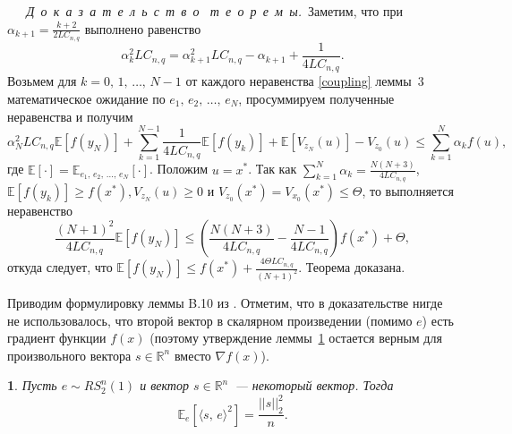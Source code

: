 \documentclass[11pt]{article}
\newcommand{\E}{\mathbb{E}}
\newcommand{\RR}{\mathbb{R}}
\newcounter{fakecnt}
\newtheorem{LemAp}{\hspace{\parindent}{\sl Л~е~м~м~а~}}[fakecnt]
\begin{document}
		\textsl{~~~Д~о~к~а~з~а~т~е~л~ь~с~т~в~о~\; т~е~о~р~е~м~ы.}\,
	Заметим, что при $\alpha_{k+1} = \frac{k+2}{2LC_{n,q}}$ выполнено равенство
	$$
	\alpha_{k}^2LC_{n,q} = \alpha_{k+1}^2LC_{n,q} - \alpha_{k+1} + \frac{1}{4LC_{n,q}}.
	$$
	Возьмем для $k=0, \, 1, \, \ldots, \, N-1$ от каждого неравенства \eqref{coupling} леммы~3 математическое ожидание по $e_1, \, e_2, \, \ldots, \, e_N$, просуммируем полученные неравенства и получим
	$$
	\alpha_N^2LC_{n,q}\E[f(y_N)] + \sum\limits_{k=1}^{N-1}\frac{1}{4LC_{n,q}}\E[f(y_k)] + \E[V_{z_{N}}(u)] - V_{z_0}(u) \leqslant \sum\limits_{k=1}^{N}\alpha_kf(u),
	$$
	где $\E[\cdot] = \E_{e_1, \, e_2, \, \ldots, \, e_N}[\cdot]$.
	Положим $u=x^*$. Так как $\sum_{k=1}^{N}\alpha_k = \frac{N(N+3)}{4LC_{n,q}}$, $\E[f(y_k)] \geqslant f(x^*), V_{z_N}(u) \geqslant 0$ и $V_{z_0}(x^*) = V_{x_0}(x^*) \leqslant \Theta$, то выполняется неравенство
	$$
	\frac{(N+1)^2}{4LC_{n,q}}\E[f(y_N)] \leqslant \left(\frac{N(N+3)}{4LC_{n,q}} - \frac{N-1}{4LC_{n,q}}\right)f(x^*) + \Theta,
	$$
	откуда следует, что $\E[f(y_N)] \leqslant f(x^*) + \frac{4\Theta LC_{n,q}}{(N+1)^2}$. Теорема доказана.
	
	Приводим формулировку леммы B.10 из \cite{pagerank}. Отметим, что в доказательстве нигде не использовалось, что второй вектор в скалярном произведении (помимо $e$) есть градиент функции $f(x)$ (поэтому утверждение леммы~\ref{lemma_pagerank} остается верным для произвольного вектора $s\in\RR^n$ вместо $\nabla f(x)$).
	\begin{LemAp}\label{lemma_pagerank}
	    Пусть $e\sim RS_2^n(1)$ и вектор $s\in\RR^n$~--- некоторый вектор. Тогда
	    \begin{equation*}
	        \E_e[\langle s,\,e\rangle^2] = \frac{||s||_2^2}{n}.
	    \end{equation*}
	\end{LemAp}
		
	
	
		
		
\end{document}

